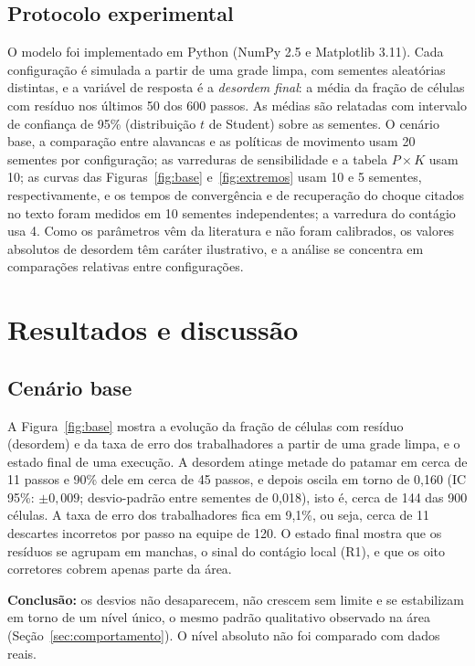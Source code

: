 \documentclass[11pt, a4paper]{article}
\begin{document}
\subsection{Protocolo experimental}
O modelo foi implementado em Python (NumPy 2.5 e Matplotlib 3.11). Cada configuração é simulada a partir de uma grade limpa, com sementes aleatórias distintas, e a variável de resposta é a \emph{desordem final}: a média da fração de células com resíduo nos últimos 50 dos 600 passos. As médias são relatadas com intervalo de confiança de 95\% (distribuição $t$ de Student) sobre as sementes. O cenário base, a comparação entre alavancas e as políticas de movimento usam 20 sementes por configuração; as varreduras de sensibilidade e a tabela $P\times K$ usam 10; as curvas das Figuras~\ref{fig:base} e~\ref{fig:extremos} usam 10 e 5 sementes, respectivamente, e os tempos de convergência e de recuperação do choque citados no texto foram medidos em 10 sementes independentes; a varredura do contágio usa 4. Como os parâmetros vêm da literatura e não foram calibrados, os valores absolutos de desordem têm caráter ilustrativo, e a análise se concentra em comparações relativas entre configurações.

\section{Resultados e discussão}\label{sec:resultados}

\subsection{Cenário base}
A Figura~\ref{fig:base} mostra a evolução da fração de células com resíduo (desordem) e da taxa de erro dos trabalhadores a partir de uma grade limpa, e o estado final de uma execução. A desordem atinge metade do patamar em cerca de 11 passos e 90\% dele em cerca de 45 passos, e depois oscila em torno de 0,160 (IC 95\%: $\pm0{,}009$; desvio-padrão entre sementes de 0,018), isto é, cerca de 144 das 900 células. A taxa de erro dos trabalhadores fica em 9,1\%, ou seja, cerca de 11 descartes incorretos por passo na equipe de 120. O estado final mostra que os resíduos se agrupam em manchas, o sinal do contágio local (R1), e que os oito corretores cobrem apenas parte da área.

\textbf{Conclusão:} os desvios não desaparecem, não crescem sem limite e se estabilizam em torno de um nível único, o mesmo padrão qualitativo observado na área (Seção~\ref{sec:comportamento}). O nível absoluto não foi comparado com dados reais.
\end{document}
